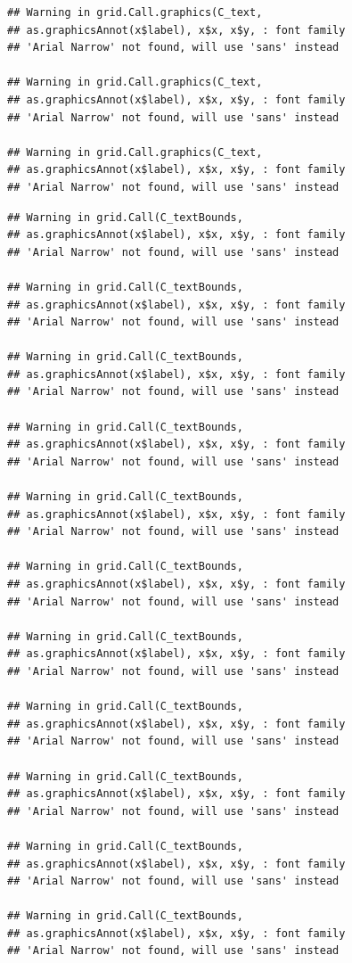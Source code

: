 \documentclass[]{krantz}
\begin{document}
\begin{verbatim}
## Warning in grid.Call.graphics(C_text,
## as.graphicsAnnot(x$label), x$x, x$y, : font family
## 'Arial Narrow' not found, will use 'sans' instead

## Warning in grid.Call.graphics(C_text,
## as.graphicsAnnot(x$label), x$x, x$y, : font family
## 'Arial Narrow' not found, will use 'sans' instead

## Warning in grid.Call.graphics(C_text,
## as.graphicsAnnot(x$label), x$x, x$y, : font family
## 'Arial Narrow' not found, will use 'sans' instead
\end{verbatim}

\begin{verbatim}
## Warning in grid.Call(C_textBounds,
## as.graphicsAnnot(x$label), x$x, x$y, : font family
## 'Arial Narrow' not found, will use 'sans' instead

## Warning in grid.Call(C_textBounds,
## as.graphicsAnnot(x$label), x$x, x$y, : font family
## 'Arial Narrow' not found, will use 'sans' instead

## Warning in grid.Call(C_textBounds,
## as.graphicsAnnot(x$label), x$x, x$y, : font family
## 'Arial Narrow' not found, will use 'sans' instead

## Warning in grid.Call(C_textBounds,
## as.graphicsAnnot(x$label), x$x, x$y, : font family
## 'Arial Narrow' not found, will use 'sans' instead

## Warning in grid.Call(C_textBounds,
## as.graphicsAnnot(x$label), x$x, x$y, : font family
## 'Arial Narrow' not found, will use 'sans' instead

## Warning in grid.Call(C_textBounds,
## as.graphicsAnnot(x$label), x$x, x$y, : font family
## 'Arial Narrow' not found, will use 'sans' instead

## Warning in grid.Call(C_textBounds,
## as.graphicsAnnot(x$label), x$x, x$y, : font family
## 'Arial Narrow' not found, will use 'sans' instead

## Warning in grid.Call(C_textBounds,
## as.graphicsAnnot(x$label), x$x, x$y, : font family
## 'Arial Narrow' not found, will use 'sans' instead

## Warning in grid.Call(C_textBounds,
## as.graphicsAnnot(x$label), x$x, x$y, : font family
## 'Arial Narrow' not found, will use 'sans' instead

## Warning in grid.Call(C_textBounds,
## as.graphicsAnnot(x$label), x$x, x$y, : font family
## 'Arial Narrow' not found, will use 'sans' instead

## Warning in grid.Call(C_textBounds,
## as.graphicsAnnot(x$label), x$x, x$y, : font family
## 'Arial Narrow' not found, will use 'sans' instead


\end{verbatim}
\end{document}
